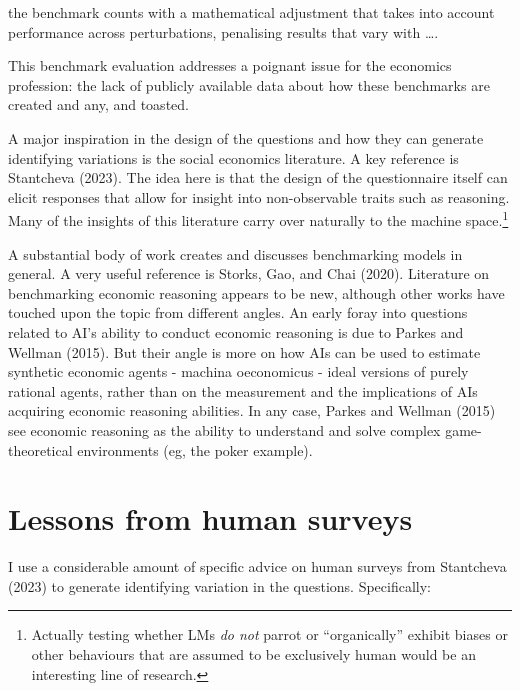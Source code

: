 \documentclass[
]{article}
\begin{document}
the benchmark counts with a mathematical adjustment that takes into
account performance across perturbations, penalising results that vary
with \ldots.

This benchmark evaluation addresses a poignant issue for the economics
profession: the lack of publicly available data about how these
benchmarks are created and any, and toasted.

A major inspiration in the design of the questions and how they can
generate identifying variations is the social economics literature. A
key reference is Stantcheva (2023). The idea here is that the design of
the questionnaire itself can elicit responses that allow for insight
into non-observable traits such as reasoning. Many of the insights of
this literature carry over naturally to the machine space.\footnote{Actually
  testing whether LMs \emph{do not} parrot or ``organically'' exhibit
  biases or other behaviours that are assumed to be exclusively human
  would be an interesting line of research.}

A substantial body of work creates and discusses benchmarking models in
general. A very useful reference is Storks, Gao, and Chai (2020).
Literature on benchmarking economic reasoning appears to be new,
although other works have touched upon the topic from different angles.
An early foray into questions related to AI's ability to conduct
economic reasoning is due to Parkes and Wellman (2015). But their angle
is more on how AIs can be used to estimate synthetic economic agents -
machina oeconomicus - ideal versions of purely rational agents, rather
than on the measurement and the implications of AIs acquiring economic
reasoning abilities. In any case, Parkes and Wellman (2015) see economic
reasoning as the ability to understand and solve complex
game-theoretical environments (eg, the poker example).

\section{Lessons from human surveys}\label{lessons-from-human-surveys}

I use a considerable amount of specific advice on human surveys from
Stantcheva (2023) to generate identifying variation in the questions.
Specifically:
\end{document}
